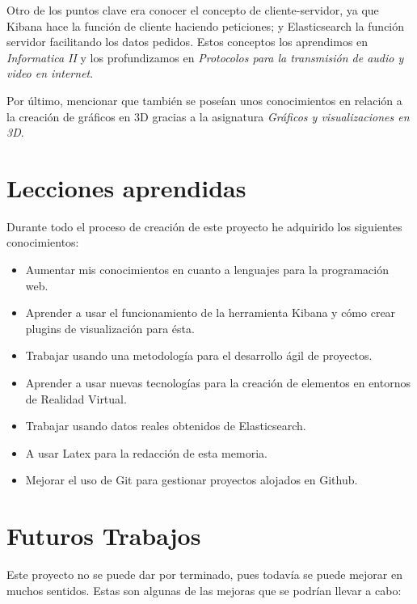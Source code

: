\documentclass[a4paper, 12pt]{book}
\begin{document}
Otro de los puntos clave era conocer el concepto de cliente-servidor, ya que Kibana hace la función de cliente haciendo peticiones; y Elasticsearch la función servidor facilitando los datos pedidos. Estos conceptos los aprendimos en \textit{Informatica II} y los profundizamos en \textit{Protocolos para la transmisión de audio y video en internet}. 

Por último, mencionar que también se poseían unos conocimientos en relación a la creación de gráficos en 3D gracias a la asignatura \textit{Gráficos y visualizaciones en 3D}.

\section{Lecciones aprendidas}
\label{sec:lecciones}

Durante todo el proceso de creación de este proyecto he adquirido los siguientes conocimientos:

\begin{itemize}
    \item Aumentar mis conocimientos en cuanto a lenguajes para la programación web.
    \item Aprender a usar el funcionamiento de la herramienta Kibana y cómo crear plugins de visualización para ésta.
    \item Trabajar usando una metodología para el desarrollo ágil de proyectos.
    \item Aprender a usar nuevas tecnologías para la creación de elementos en entornos de Realidad Virtual.
    \item Trabajar usando datos reales obtenidos de Elasticsearch.
    \item A usar Latex para la redacción de esta memoria. 
    \item Mejorar el uso de Git para gestionar proyectos alojados en Github.
\end{itemize}


\section{Futuros Trabajos}
\label{sec:futuro}

 Este proyecto no se puede dar por terminado, pues todavía se puede mejorar en muchos sentidos. Estas son algunas de las mejoras que se podrían llevar a cabo:
 
\end{document}
